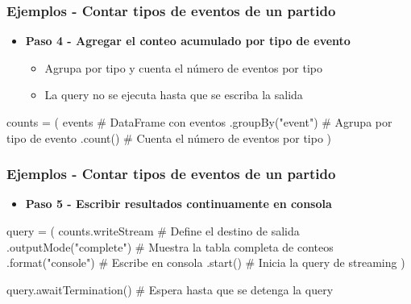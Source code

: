 \documentclass[aspectratio=169]{beamer}
\begin{document}
\begin{frame}[fragile]\frametitle{Ejemplos - Contar tipos de eventos de un partido}

\begin{itemize}
	\item \textbf{Paso 4 - Agregar el conteo acumulado por tipo de evento}
	\begin{itemize}
		\item Agrupa por tipo y cuenta el número de eventos por tipo
		\item La query no se ejecuta hasta que se escriba la salida
	\end{itemize}
\end{itemize}

\vspace{1em}

\begin{code}
\begin{python3code}
counts = (
    events			 # DataFrame con eventos
    .groupBy("event")  # Agrupa por tipo de evento
    .count()		   # Cuenta el número de eventos por tipo
)
\end{python3code}
\end{code}
\end{frame}


\begin{frame}[fragile]\frametitle{Ejemplos - Contar tipos de eventos de un partido}

\begin{itemize}
	\item \textbf{Paso 5 - Escribir resultados continuamente en consola}
\end{itemize}

\vspace{1em}

\begin{code}
\begin{python3code}
query = (
    counts.writeStream        # Define el destino de salida
    .outputMode("complete")   # Muestra la tabla completa de conteos
    .format("console")        # Escribe en consola
    .start()                  # Inicia la query de streaming
)

query.awaitTermination()      # Espera hasta que se detenga la query
\end{python3code}
\end{code}
\end{frame}
\end{document}
